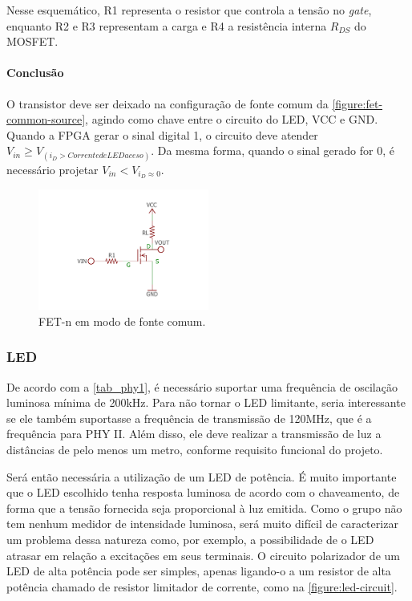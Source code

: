 	Nesse esquemático, R1 representa o resistor que controla a tensão no \textit{gate}, enquanto R2 e R3 representam a carga e R4 a resistência interna $R_{DS}$ do MOSFET.

	\paragraph*{Conclusão}

	O transistor deve ser deixado na configuração de fonte comum da \autoref{figure:fet-common-source}, agindo como chave entre o circuito do LED, VCC e GND. Quando a FPGA gerar o sinal digital 1, o circuito deve atender $V_{in} \geq V_{(i_{D} > Corrente de LED aceso)}$. Da mesma forma, quando o sinal gerado for 0, é necessário projetar  $V_{in} < V_{i_{D} \approx 0}$.

	\begin{figure}[h]
		\caption{\label{figure:fet-common-source}FET-n em modo de fonte comum.}
		\centering
		\includegraphics[width=0.5\textwidth, trim={0cm 2cm 0cm 2cm}, clip]{circuits/mosfet_example.pdf}
	\end{figure}

	\subsubsection{LED}\label{method-hardware-led}

	De acordo com a \autoref{tab_phy1}, é necessário suportar uma frequência de oscilação luminosa mínima de 200kHz. Para não tornar o LED limitante, seria interessante se ele também suportasse a frequência de transmissão de 120MHz, que é a frequência para PHY II. Além disso, ele deve realizar a transmissão de luz a distâncias de pelo menos um metro, conforme requisito funcional do projeto.

	Será então necessária a utilização de um LED de potência. É muito importante que o LED escolhido tenha resposta luminosa de acordo com o chaveamento, de forma que a tensão fornecida seja proporcional à luz emitida. Como o grupo não tem nenhum medidor de intensidade luminosa, será muito difícil de caracterizar um problema dessa natureza como, por exemplo, a possibilidade de o LED atrasar em relação a excitações em seus terminais. O circuito polarizador de um LED de alta potência pode ser simples, apenas ligando-o a um resistor de alta potência chamado de resistor limitador de corrente, como na \autoref{figure:led-circuit}.


